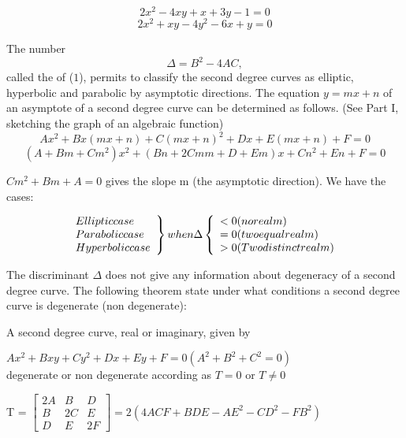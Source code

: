 \documentclass[11pt]{amsbook}
\begin{document}
	\[
		2x^2 - 4xy + x + 3y - 1 = 0		
	\]		
	\[	
		2x^2 + xy - 4y^2 - 6x + y = 0
	\]
	
The number
	\[
	\Delta = B^{2} - 4AC,
	\]
called the  of ($1$), permits to classify the second
degree curves as elliptic, hyperbolic and parabolic by asymptotic
directions. The equation $y = mx + n$ of an asymptote of a
second degree curve can be determined as follows. (See Part I,
sketching the graph of an algebraic function)
\[
	Ax^2 + Bx(mx+n) + C{(mx + n)}^2 + Dx + E(mx+n) + F = 0
\]
\[
	(A+Bm+Cm^2)x^2 + (Bn + 2Cmm + D + Em)x + Cn^2 + En + F = 0 
\] 

$Cm^2 + Bm + A = 0$ gives the slope m (the asymptotic direction). We have the cases: 

\[ \left. \begin{array}{ll}
Elliptic  case \\
Parabolic  case \\
Hyperbolic  case \\
\end{array} \right  \} 
 when\Delta  \left\{ 
\begin{array}{ll}
 < 0 \text(no real m)\\
 = 0 (two equal real m) \\
 > 0 (Two distinct real m) 
\end{array} 
\right.
\]

The discriminant $\Delta$ does not give any information about
degeneracy of a second degree curve. The following theorem state
under what conditions a second degree curve is degenerate (non
degenerate): 

\begin{thm}
	A second degree curve, real or imaginary, given by
	\begin{center}
		$Ax^2 + Bxy + Cy^2 + Dx + Ey + F = 0 (A^2 + B^2 + C^2 = 0)$ \\
		
		degenerate or non degenerate according as $T = 0$ or $T \neq0$
	\end{center}
		
		
		T =
		$\begin{bmatrix}
			2A & B & D \\
			B & 2C & E \\
			D & E & 2F
		\end{bmatrix}
		= 2(4ACF + BDE - AE^2 - CD^2 - FB^2)$
\end{thm}


\end{document}
